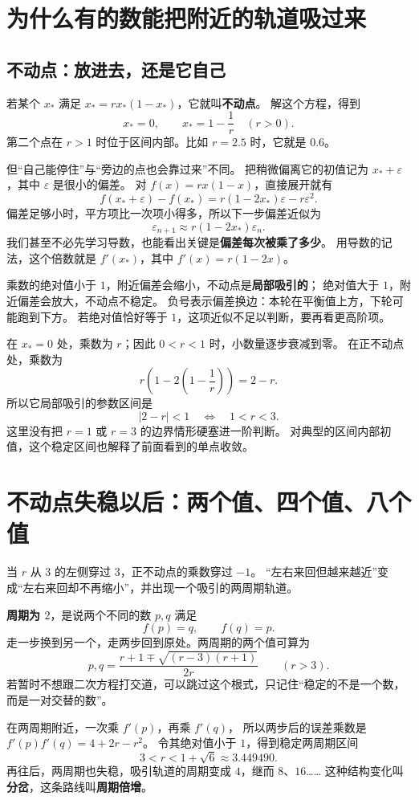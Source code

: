 \documentclass[UTF8,11pt,fontset=none]{ctexart}
\begin{document}
\section{为什么有的数能把附近的轨道吸过来}
\subsection{不动点：放进去，还是它自己}
若某个 $x_*$ 满足 $x_*=rx_*(1-x_*)$，它就叫\textbf{不动点}。
解这个方程，得到
\[
x_*=0,\qquad x_*=1-\frac1r\quad(r>0).
\]
第二个点在 $r>1$ 时位于区间内部。比如 $r=2.5$ 时，它就是 $0.6$。

但“自己能停住”与“旁边的点也会靠过来”不同。
把稍微偏离它的初值记为 $x_*+\varepsilon$，其中 $\varepsilon$ 是很小的偏差。
对 $f(x)=rx(1-x)$，直接展开就有
\[
f(x_*+\varepsilon)-f(x_*)
=r(1-2x_*)\varepsilon-r\varepsilon^2.
\]
偏差足够小时，平方项比一次项小得多，所以下一步偏差近似为
\[
\varepsilon_{n+1}\approx r(1-2x_*)\varepsilon_n.
\]
我们甚至不必先学习导数，也能看出关键是\textbf{偏差每次被乘了多少}。
用导数的记法，这个倍数就是 $f'(x_*)$，其中 $f'(x)=r(1-2x)$。

\begin{keybox}[稳定性的读法]
乘数的绝对值小于 $1$，附近偏差会缩小，不动点是\textbf{局部吸引的}；
绝对值大于 $1$，附近偏差会放大，不动点不稳定。
负号表示偏差换边：本轮在平衡值上方，下轮可能跑到下方。
若绝对值恰好等于 $1$，这项近似不足以判断，要再看更高阶项。
\end{keybox}
在 $x_*=0$ 处，乘数为 $r$；因此 $0<r<1$ 时，小数量逐步衰减到零。
在正不动点处，乘数为
\[
r\left(1-2\left(1-\frac1r\right)\right)=2-r.
\]
所以它局部吸引的参数区间是
\[
|2-r|<1\quad\Longleftrightarrow\quad1<r<3.
\]
这里没有把 $r=1$ 或 $r=3$ 的边界情形硬塞进一阶判断。
对典型的区间内部初值，这个稳定区间也解释了前面看到的单点收敛。

\section{不动点失稳以后：两个值、四个值、八个值}
当 $r$ 从 $3$ 的左侧穿过 $3$，正不动点的乘数穿过 $-1$。
“左右来回但越来越近”变成“左右来回却不再缩小”，并出现一个吸引的两周期轨道。

\textbf{周期为 $2$}，是说两个不同的数 $p,q$ 满足
\[
f(p)=q,\qquad f(q)=p.
\]
走一步换到另一个，走两步回到原处。两周期的两个值可算为
\[
p,q=\frac{r+1\mp\sqrt{(r-3)(r+1)}}{2r}\qquad(r>3).
\]
若暂时不想跟二次方程打交道，可以跳过这个根式，只记住“稳定的不是一个数，而是一对交替的数”。

在两周期附近，一次乘 $f'(p)$，再乘 $f'(q)$，
所以两步后的误差乘数是 $f'(p)f'(q)=4+2r-r^2$。
令其绝对值小于 $1$，得到稳定两周期区间
\[
3<r<1+\sqrt6\approx3.449490.
\]
再往后，两周期也失稳，吸引轨道的周期变成 $4$，继而 $8$、$16$……
这种结构变化叫\textbf{分岔}，这条路线叫\textbf{周期倍增}。
\end{document}
